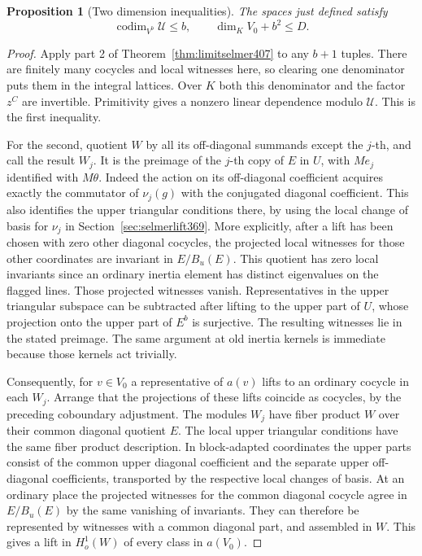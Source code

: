 \documentclass[a4paper,11pt]{article}
\newtheorem{proposition}{Proposition}[section]
\theoremstyle{definition}
\theoremstyle{remark}
\numberwithin{equation}{section}
\begin{document}
\begin{proposition}[Two dimension inequalities]\leavevmode
\label{prop:pairedrank411}
The spaces just defined satisfy
\[
             \operatorname{codim}_{V^b}\mathcal U\le b,
                    \qquad \dim_K V_0+b^2\le D .
\]
\end{proposition}
\begin{proof}
Apply part 2 of Theorem~\ref{thm:limitselmer407} to any
\(b+1\) tuples. There are finitely many cocycles and local
witnesses here, so clearing one denominator puts them in
the integral lattices. Over \(K\) both this denominator and
the factor \(z^C\) are invertible. Primitivity gives a
nonzero linear dependence modulo \(\mathcal U\). This is
the first inequality.

For the second, quotient \(W\) by all its off-diagonal
summands except the \(j\)-th, and call the result \(W_j\).
It is the preimage of the \(j\)-th copy of \(E\) in \(U\),
with \(M e_j\) identified with \(M\theta\).
Indeed the action on its off-diagonal coefficient acquires
exactly the commutator of \(\nu_j(g)\) with the conjugated
diagonal coefficient. This also identifies the upper
triangular conditions there, by using the local change of
basis for \(\nu_j\) in Section~\ref{sec:selmerlift369}.
More explicitly, after a lift has been chosen with zero
other diagonal cocycles, the projected local witnesses for
those other coordinates are invariant in \(E/B_u(E)\).
This quotient has zero local invariants since an ordinary
inertia element has distinct eigenvalues on the flagged
lines. Those projected witnesses vanish. Representatives
in the upper triangular subspace can be subtracted after
lifting to the upper part of \(U\), whose projection onto
the upper part of \(E^b\) is surjective. The resulting
witnesses lie in the stated preimage. The same argument
at old inertia kernels is immediate because those kernels
act trivially.

Consequently, for \(v\in V_0\) a representative of \(a(v)\)
lifts to an ordinary cocycle in each \(W_j\). Arrange that
the projections of these lifts coincide as cocycles, by
the preceding coboundary adjustment. The modules \(W_j\)
have fiber product \(W\) over their common diagonal
quotient \(E\). The local upper triangular conditions
have the same fiber product description. In block-adapted
coordinates the upper parts consist of the common upper
diagonal coefficient and the separate upper off-diagonal
coefficients, transported by the respective local changes
of basis. At an ordinary place the projected witnesses
for the common diagonal cocycle agree in \(E/B_u(E)\)
by the same vanishing of invariants. They can therefore
be represented by witnesses with a common diagonal part,
and assembled in \(W\). This gives a lift in \(H^1_o(W)\)
of every class in \(a(V_0)\).


\end{proof}
\end{document}
